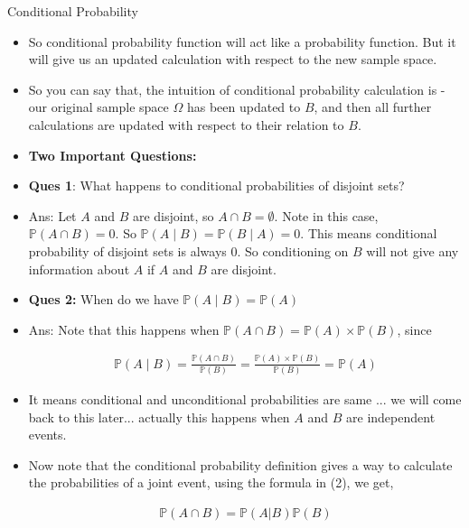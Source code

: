 \documentclass[8pt, usepdftitle = false]{beamer}
\begin{document}
\begin{frame}[allowframebreaks]{Conditional Probability}
\begin{itemize}
\item So conditional probability function will act like a probability function. But it will give us an updated calculation with respect to the new sample space. 


\item So you can say that, the intuition of conditional probability calculation is - our original sample space $\Omega$ has been updated to $B$, and then all further calculations are updated with respect to their relation to $B$. 

\framebreak

\item \textbf{Two Important Questions:}


\item \textbf{Ques 1}: What happens to conditional probabilities of disjoint sets? 


\item Ans: Let $A$ and $B$ are disjoint, so $A \cap B = \emptyset$. Note in this case, $\mathbb{P}(A \cap B)=0$. So $\mathbb{P}(A \mid B)=\mathbb{P}(B \mid A)=0$. This means conditional probability of disjoint sets is always $0$. So conditioning on $B$ will not give any information about $A$ if $A$ and $B$ are disjoint. 


\medskip

\item \textbf{Ques 2:} When do we have $\mathbb{P}(A \mid B) = \mathbb{P}(A)$ 

\item Ans: Note that this happens when $\mathbb{P}(A \cap B) = \mathbb{P}(A) \times \mathbb{P}(B)$, since

\begin{align*}
 	\mathbb{P}(A \mid B) = \frac{\mathbb{P}(A \cap B)}{\mathbb{P}(B)} = \frac{\mathbb{P}(A) \times \mathbb{P}(B)}{\mathbb{P}(B)} = \mathbb{P}(A)
 \end{align*} 

\item It means conditional and unconditional probabilities are same ... we will come back to this later... actually this happens when $A$ and $B$ are independent events.


\framebreak

\item Now note that the conditional probability definition gives a way to calculate the probabilities of a joint event, using the formula in (2), we get,


\begin{align}
\mathbb{P}(A \cap B) = \mathbb{P}(A | B) \mathbb{P}(B)
\end{align}


\end{itemize}
\end{frame}
\end{document}
